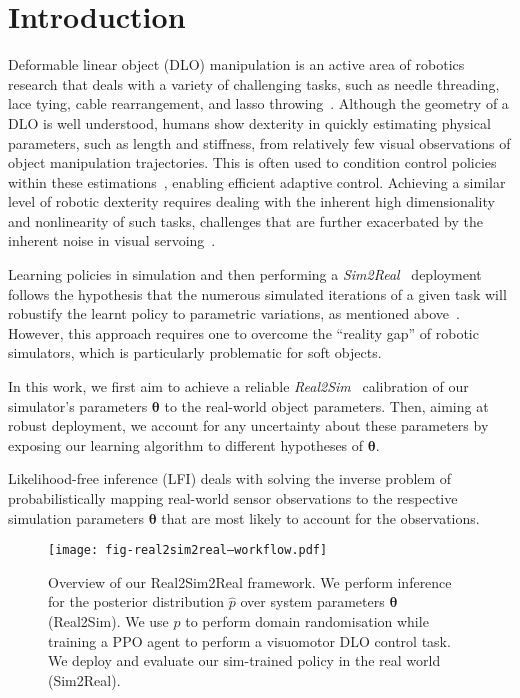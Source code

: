 \section{Introduction}
\label{sec:intro}

Deformable linear object (DLO) manipulation is an active area of robotics research that deals with a variety of challenging tasks, such as needle threading, lace tying, cable rearrangement, and lasso throwing~\cite{zhang2021robots, chi2024iterative, haiderbhai2024sim2real}. Although the geometry of a DLO is well understood, humans show dexterity in quickly estimating physical parameters, such as length and stiffness, from relatively few visual observations of object manipulation trajectories. This is often used to condition control policies within these estimations~\cite{kuroki2024gendom, zhang2024adaptigraph}, enabling efficient adaptive control. Achieving a similar level of robotic dexterity requires dealing with the inherent high dimensionality and nonlinearity of such tasks, challenges that are further exacerbated by the inherent noise in visual servoing~\cite{arriola2020modeling, yin2021modeling}.

Learning policies in simulation and then performing a \emph{Sim2Real}~\cite{liang2024real, haiderbhai2024sim2real} deployment follows the hypothesis that the numerous simulated iterations of a given task will robustify the learnt policy to parametric variations, as mentioned above~\cite{peng2018sim}. However, this approach requires one to overcome the ``reality gap'' of robotic simulators, which is particularly problematic for soft objects. 

In this work, we first aim to achieve a reliable \emph{Real2Sim}~\cite{mehta2021user, liang2020learning} calibration of our simulator's parameters $\boldsymbol{\theta}$ to the real-world object parameters. Then, aiming at robust deployment, we account for any uncertainty about these parameters by exposing our learning algorithm to different hypotheses of $\boldsymbol{\theta}$.

Likelihood-free inference (LFI) deals with solving the inverse problem of probabilistically mapping real-world sensor observations to the respective simulation parameters $\boldsymbol{\theta}$ that are most likely to account for the observations.

\begin{figure}[!t]
    \centering
    \texttt{[image: fig-real2sim2real--workflow.pdf]}
    \caption{Overview of our Real2Sim2Real framework. We perform inference for the posterior distribution $\hat{p}$ over system parameters $\boldsymbol{\theta}$ (Real2Sim). We use $\hat{p}$ to perform domain randomisation while training a PPO agent to perform a visuomotor DLO control task. We deploy and evaluate our sim-trained policy in the real world (Sim2Real).}
    \label{fig:header-system-overview}
\end{figure}


